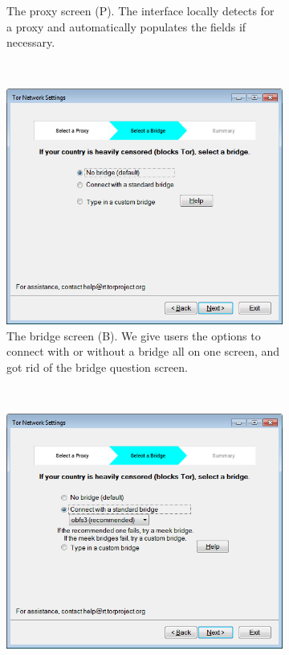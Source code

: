 \documentclass[USenglish,oneside,twocolumn]{article}
\begin{document}
\begin{figure}
\begin{subfigure}[b]{0.30\textwidth}
	\centering\captionsetup{width=1.5\linewidth}%
	\caption{The proxy screen (P). The interface locally detects for a proxy and automatically populates the fields if necessary.}
	\label{fig:new-proxy}
\end{subfigure}
~~~~~~~~~~
\begin{subfigure}[b]{0.30\textwidth}
	\includegraphics[width=\textwidth]{screenshots/NEW-bridgeSettings.png}
	\centering\captionsetup{width=1.5\linewidth}%
	\caption{The bridge screen (B). We give users the options to connect with or without a bridge all on one screen, and got rid of the bridge question screen.}
	\label{fig:new-nobridge}
\end{subfigure}
~~~~~~~~~~~~~~~~~~~~~~~~~
\begin{subfigure}[b]{0.30\textwidth}
	\includegraphics[width=\textwidth]{screenshots/NEW-bridgeSettings-default.png}

\end{subfigure}
\end{figure}
\end{document}
